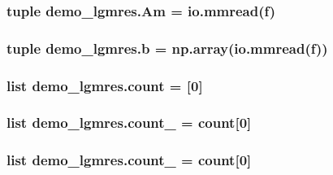 \subsubsection[{Am}]{\setlength{\rightskip}{0pt plus 5cm}tuple demo\+\_\+lgmres.\+Am = io.\+mmread({\bf f})}\label{namespacedemo__lgmres_afc20f9e38da2eac6a55e8a2d6e4ea957}
\hypertarget{namespacedemo__lgmres_ad5208339e2d70ebaceb6d7dfaa870ae6}{}
\subsubsection[{b}]{\setlength{\rightskip}{0pt plus 5cm}tuple demo\+\_\+lgmres.\+b = np.\+array(io.\+mmread({\bf f}))}\label{namespacedemo__lgmres_ad5208339e2d70ebaceb6d7dfaa870ae6}
\hypertarget{namespacedemo__lgmres_ac9e673dc62252034a7fe574079efd706}{}
\subsubsection[{count}]{\setlength{\rightskip}{0pt plus 5cm}list demo\+\_\+lgmres.\+count = \mbox{[}0\mbox{]}}\label{namespacedemo__lgmres_ac9e673dc62252034a7fe574079efd706}
\hypertarget{namespacedemo__lgmres_a79b07e79e94a879b1e523ece055df7fe}{}
\subsubsection[{count\+\_\+0}]{\setlength{\rightskip}{0pt plus 5cm}list demo\+\_\+lgmres.\+count\+\_ = {\bf count}\mbox{[}0\mbox{]}}\label{namespacedemo__lgmres_a79b07e79e94a879b1e523ece055df7fe}
\hypertarget{namespacedemo__lgmres_ad3fa23497c9b75adefbbec0118ca48c0}{}
\subsubsection[{count\+\_\+1}]{\setlength{\rightskip}{0pt plus 5cm}list demo\+\_\+lgmres.\+count\+\_ = {\bf count}\mbox{[}0\mbox{]}}\label{namespacedemo__lgmres_ad3fa23497c9b75adefbbec0118ca48c0}
\hypertarget{namespacedemo__lgmres_a0b2db09bcc33bd61438fb32ca0a26a40}{}
